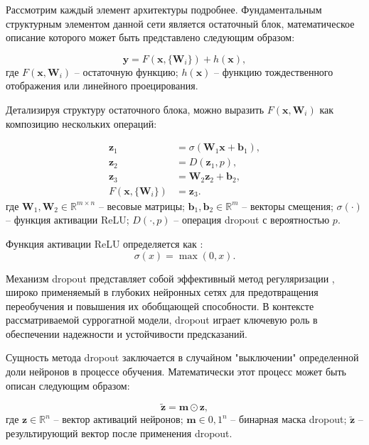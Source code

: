 Рассмотрим каждый элемент архитектуры подробнее.
Фундаментальным структурным элементом данной сети является остаточный блок,
математическое описание которого может быть представлено следующим образом:

\begin{equation*}
    \mathbf{y} = F(\mathbf{x}, \{\mathbf{W}_i\}) + h(\mathbf{x}),
\end{equation*}
где $F(\mathbf{x}, {\mathbf{W}_i})$ -- остаточную функцию;
$h(\mathbf{x})$ -- функцию тождественного отображения или линейного проецирования.

Детализируя структуру остаточного блока,
можно выразить $F(\mathbf{x}, {\mathbf{W}_i})$ как композицию нескольких операций:

\begin{equation*}
    \begin{split}
        \mathbf{z}_1                    & = \sigma(\mathbf{W}_1\mathbf{x} + \mathbf{b}_1), \\
        \mathbf{z}_2                    & = D(\mathbf{z}_1, p),                            \\
        \mathbf{z}_3                    & = \mathbf{W}_2\mathbf{z}_2 + \mathbf{b}_2,       \\
        F(\mathbf{x}, \{\mathbf{W}_i\}) & = \mathbf{z}_3.
    \end{split}
\end{equation*}
где $\mathbf{W}_1, \mathbf{W}_2 \in \mathbb{R}^{m \times n}$ -- весовые матрицы;
$\mathbf{b}_1, \mathbf{b}_2 \in \mathbb{R}^m$ -- векторы смещения;
$\sigma(\cdot)$ -- функция активации ReLU;
$D(\cdot, p)$ -- операция dropout с вероятностью $p$.

Функция активации ReLU определяется как \cite*{nair2010rectified}:
\begin{equation*}
    \sigma(x) = \max(0, x).
\end{equation*}

Механизм dropout представляет собой эффективный метод регуляризации \cite*{srivastava2014dropout},
широко применяемый в глубоких нейронных сетях для предотвращения переобучения
и повышения их обобщающей способности. В контексте рассматриваемой суррогатной
модели, dropout играет ключевую роль в обеспечении надежности
и устойчивости предсказаний.

Сущность метода dropout заключается в случайном "выключении" определенной
доли нейронов в процессе обучения. Математически этот процесс может быть описан
следующим образом:

\begin{equation*}
    \tilde{\mathbf{z}} = \mathbf{m} \odot \mathbf{z},
\end{equation*}
где $\mathbf{z} \in \mathbb{R}^n$ -- вектор активаций нейронов;
$\mathbf{m} \in {0, 1}^n$ -- бинарная маска dropout;
$\tilde{\mathbf{z}}$ -- результирующий вектор после применения dropout.

